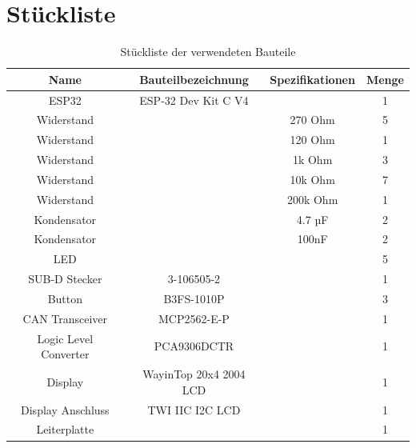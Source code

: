 \section{Stückliste}

\begin{table}[htbp]
  \begin{center} %
      \begin{tabular}{cccc} %
          \hline %
          Name & Bauteilbezeichnung & Spezifikationen & Menge \\ %
          \hline %
          ESP32 & ESP-32 Dev Kit C V4 &  & 1\\
          Widerstand  &  & 270 Ohm & 5 \\
          Widerstand &  & 120 Ohm & 1 \\
          Widerstand &  & 1k Ohm & 3 \\
          Widerstand &  & 10k Ohm & 7\\
          Widerstand &  & 200k Ohm & 1\\
          Kondensator &  & 4.7 µF & 2\\
          Kondensator &  & 100nF & 2\\
          LED &  & & 5\\
          SUB-D Stecker & 3-106505-2 & & 1\\
          Button & B3FS-1010P & & 3\\
          CAN Transceiver & MCP2562-E-P & & 1\\
          Logic Level Converter & PCA9306DCTR & & 1\\
          Display & WayinTop 20x4 2004 LCD & & 1\\
          Display Anschluss & TWI IIC I2C LCD & & 1\\
          Leiterplatte &  & & 1\\
          \hline %
      \end{tabular}
  \caption{Stückliste der verwendeten Bauteile}
  \label{tab:Stückliste}
  \end{center}
  \end{table}